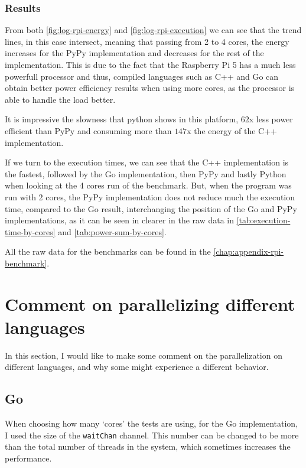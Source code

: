\subsubsection{Results}






From both \autoref{fig:log-rpi-energy} and \autoref{fig:log-rpi-execution} we can see that the trend lines, in this case intersect, meaning that passing from 2 to 4 cores, the energy increases for the PyPy implementation and decreases for the rest of the implementation. This is due to the fact that the Raspberry Pi 5 has a much less powerfull processor and thus, compiled languages such as C++ and Go can obtain better power efficiency results when using more cores, as the processor is able to handle the load better. 

It is impressive the slowness that python shows in this platform, $62$x less power efficient than PyPy and consuming more than $147$x the energy of the C++ implementation. 

If we turn to the execution times, we can see that the C++ implementation is the fastest, followed by the Go implementation, then PyPy and lastly Python when looking at the 4 cores run of the benchmark. But, when the program was run with 2 cores, the PyPy implementation does not reduce much the execution time, compared to the Go result, interchanging the position of the Go and PyPy implementations, as it can be seen in clearer in the raw data in \autoref{tab:execution-time-by-cores} and \autoref{tab:power-sum-by-cores}.

All the raw data for the benchmarks can be found in the \autoref{chap:appendix-rpi-benchmark}.

\section{Comment on parallelizing different languages}

In this section, I would like to make some comment on the parallelization on different languages, and why some might experience a different behavior. 

\subsection{Go}
When choosing how many `cores' the tests are using, for the Go implementation, I used the size of the \texttt{waitChan} channel. This number can be changed to be more than the total number of threads in the system, which sometimes increases the performance.

